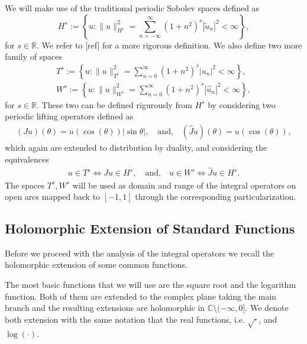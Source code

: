 \documentclass{article}
\newcommand{\todo}[1]{{\color{red}[#1]}}
\newcommand{\IC}{{\mathbb C}}
\newcommand{\IR}{{\mathbb R}}
\begin{document}
We will make use of the traditional periodic Sobolev spaces defined as 
$$
H^s := \left\lbrace u : \| u\|_{H^s}^2 = \sum_{n=-\infty}^\infty (1+n^2)^s |\widetilde{u}_n|^2 < \infty \right\rbrace,
$$
for $s\in \IR$. We refer to \todo{ref} for a more rigorous definition. We also define two more family of spaces
\begin{align*}
T^s := \left\lbrace u : \| u\|_{T^s}^2 = \sum_{n=0}^\infty (1+n^2)^s |{u}_n|^2 < \infty \right\rbrace, \\
W^s := \left\lbrace u : \| u\|_{W^s}^2 = \sum_{n=0}^\infty (1+n^2)^s |\widehat{u}_n|^2 < \infty \right\rbrace,
\end{align*} 
for $s \in \IR$. These two can be defined rigurously from $H^s$ by considering two periodic lifting operators defined as 
\begin{align}
\label{eq:liffings}
(Ju) (\theta) = u(\cos(\theta)) | \sin \theta|, \quad \text{and,} \quad
(\widehat{J}u)(\theta) = u (\cos(\theta)),
\end{align}
which again are extended to distribution by duality, and considering the equivalences 
\begin{align*}
u \in T^s \Leftrightarrow Ju \in H^s, \quad \text{and,} \quad u \in W^s \Leftrightarrow \widehat{J}u \in H^s.
\end{align*}
The spaces $T^s,W^s$ will be used as domain and range of the integral operators on open arcs mapped back to $[-1,1]$ through the corresponding particularization.
\subsection{Holomorphic Extension of Standard Functions}
Before we proceed with the analysis of the integral operators we recall the holomorphic extension of some common functions.

The most basic functions that we will use are the square root and the logarithm function. Both of them are extended to the complex plane taking the main branch and the resulting extensions are holomorphic in $\IC \setminus (-\infty,0]$. We denote both extension with the same notation that the real functions, i.e. $\sqrt{\cdot}$, and $\log{(\cdot)}$.   
\end{document}
